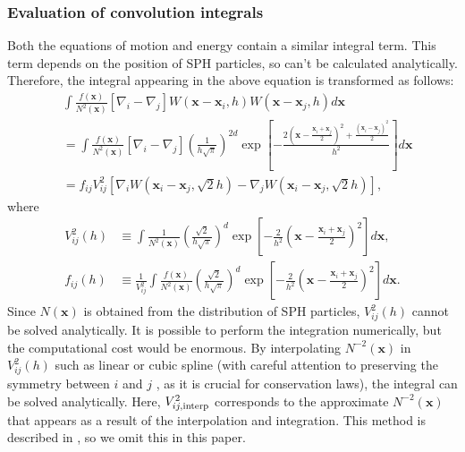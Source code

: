 \documentclass[]{aastex631}
\begin{document}
\subsubsection{Evaluation of convolution integrals}\label{evaluation_const}
Both the equations of motion and energy contain a similar integral term.
This term depends on the position of SPH particles, so can't be calculated analytically.
Therefore, the integral appearing in the above equation is transformed as follows:
\begin{align}
    &\int \frac{f(\bm{x})}{N^2(\bm{x})}[\nabla_i-\nabla_j] W(\bm{x}-\bm{x}_i,h)W(\bm{x}-\bm{x}_j,h)d\bm{x}\\
    &=\int \frac{f(\bm{x})}{N^2(\bm{x})}[\nabla_i-\nabla_j]\left( \frac{1}{h\sqrt{\pi}} \right)^{2d}\exp\left[ -\frac{ 2\left( \bm{x}-\frac{\bm{x}_i+\bm{x}_j}{2} \right)^2+\frac{(\bm{x}_i-\bm{x}_j)^2}{2} }{h^2} \right]d\bm{x}\\
    &= f_{ij}V^2_{ij}[\nabla_iW(\bm{x}_i-\bm{x}_j,\sqrt{2}h) - \nabla_jW(\bm{x}_i-\bm{x}_j,\sqrt{2}h)],
\end{align}
where
\begin{align}
    V^2_{ij}(h)&\equiv\int \frac{1}{N^2(\bm{x})} \left( \frac{\sqrt{2}}{h\sqrt{\pi}} \right)^d \exp\left[ -\frac{2}{h^2}\left( \bm{x}-\frac{\bm{x}_i+\bm{x}_j}{2} \right)^2 \right] d\bm{x},\\
    f_{ij}(h)&\equiv\frac{1}{V^2_{ij}}\int \frac{f(\bm{x})}{N^2(\bm{x})} \left( \frac{\sqrt{2}}{h\sqrt{\pi}} \right)^d \exp\left[ -\frac{2}{h^2}\left( \bm{x}-\frac{\bm{x}_i+\bm{x}_j}{2} \right)^2 \right] d\bm{x}.
\end{align}
Since $N(\bm{x})$ is obtained from the distribution of SPH particles, $V^2_{ij}(h)$ cannot be solved analytically.
It is possible to perform the integration numerically, but the computational cost would be enormous.
By interpolating $N^{-2}(\bm{x})$ in $V^2_{ij}(h)$ such as linear or cubic spline (with careful attention to preserving the symmetry between  $i$  and  $j$ , as it is crucial for conservation laws), the integral can be solved analytically.
Here, $V_{ij, {\rm interp}}^2$ corresponds to the approximate $N^{-2} (\bm{x})$ that appears as a result of the interpolation and integration.
This method is described in \citep{Inutsuka_2002}, so we omit this in this paper.
\end{document}
